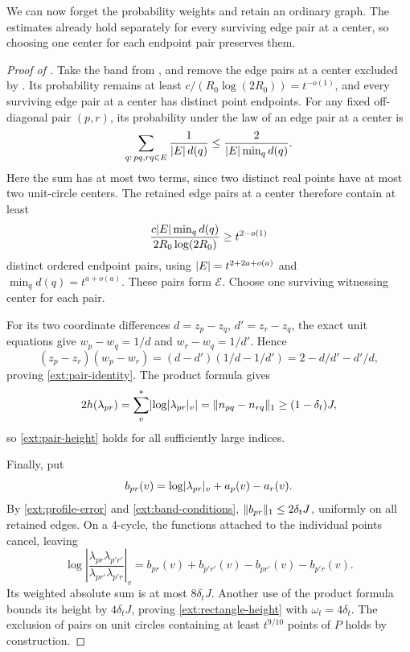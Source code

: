 We can now forget the probability weights and retain an ordinary graph.
The estimates already hold separately for every surviving edge pair at a center, so
choosing one center for each endpoint pair preserves them.

\begin{proof}[Proof of ]
Take the band from , and remove the edge pairs at a center excluded by
.  Its probability remains at least
\(c/(R_0\log(2R_0))=t^{-o(1)}\), and every surviving edge pair at a center has distinct
point endpoints.
For any fixed off-diagonal pair \((p,r)\), its probability under the law of an edge pair at a center is
\[
 \sum_{q:\,pq,rq\in E}\frac{1}{\lvert E\rvert\,d(q)}
 \le\frac{2}{\lvert E\rvert\min_qd(q)}.
\]
Here the sum has at most two terms, since two distinct real points have
at most two unit-circle centers.  The retained edge pairs at a center therefore contain
at least
\[
 \frac{c\lvert E\rvert\min_qd(q)}{2R_0\log(2R_0)}\ge t^{2-o(1)}
\]
distinct ordered endpoint pairs, using
\(\lvert E\rvert=t^{2+2a+o(a)}\) and \(\min_qd(q)=t^{a+o(a)}\).
These pairs form \(\mathcal E\).  Choose one surviving witnessing
center for each pair.

For its two coordinate differences \(d=z_p-z_q\), \(d'=z_r-z_q\), the exact unit equations
give \(w_p-w_q=1/d\) and \(w_r-w_q=1/d'\).  Hence
\[
 (z_p-z_r)(w_p-w_r)=(d-d')(1/d-1/d')
                    =2-d/d'-d'/d,
\]
proving \eqref{ext:pair-identity}.  The product formula gives
\[
 2h(\lambda_{pr})=\sum_v^*\lvert \log\lvert \lambda_{pr}\rvert_v\rvert
                  =\lVert n_{pq}-n_{rq}\rVert_1
                  \ge(1-\delta_t)J,
\]
so \eqref{ext:pair-height} holds for all sufficiently large indices.

Finally, put
\[
 b_{pr}(v)=\log\lvert \lambda_{pr}\rvert_v+a_p(v)-a_r(v).
\]
By \eqref{ext:profile-error} and \eqref{ext:band-conditions},
\(\lVert b_{pr}\rVert_1\le2\delta_tJ\), uniformly on all retained edges.
On a 4-cycle, the functions attached to the individual points cancel, leaving
\[
 \log\left|\frac{\lambda_{pr}\lambda_{p'r'}}
                    {\lambda_{pr'}\lambda_{p'r}}\right|_v
     =b_{pr}(v)+b_{p'r'}(v)-b_{pr'}(v)-b_{p'r}(v).
\]
Its weighted absolute sum is at most \(8\delta_tJ\).  Another use of the
product formula bounds its height by \(4\delta_tJ\), proving
\eqref{ext:rectangle-height} with \(\omega_t=4\delta_t\).
The exclusion of pairs on unit circles containing at least \(t^{9/10}\) points of \(P\) holds by construction.
\end{proof}
